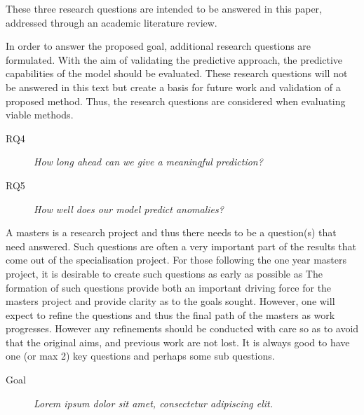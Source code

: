These three research questions are intended to be answered in this paper, addressed through an academic literature review.
\newline

In order to answer the proposed goal, additional research questions are formulated.
With the aim of validating the predictive approach, the predictive capabilities of the model should be evaluated.
These research questions will not be answered in this text but create a basis for future work and validation of a proposed method.
Thus, the research questions are considered when evaluating viable methods.

\begin{description}
    \item[RQ4]{\it How long ahead can we give a meaningful prediction?}
\end{description}

\begin{description}
    \item[RQ5]{\it How well does our model predict anomalies?}
\end{description}




\iffalse
A masters is a research project and thus there needs to be a question(s) that need answered.
Such questions are often a very important part of the results that come out of the specialisation project.
For those following the one year masters project, it is desirable to create such questions as early as possible as   The formation of such questions provide both an important driving force for the masters project and provide clarity as to the goals sought. However, one will expect to refine the questions and thus the final path of the masters as work progresses. However any refinements should be conducted with care so as to avoid that the original aims, and previous work are not lost.  
It is always good to have one (or max 2) key questions and perhaps some sub questions. 

\begin{description}
\item[Goal] {\it Lorem ipsum dolor sit amet, consectetur adipiscing elit.}
\end{description}

